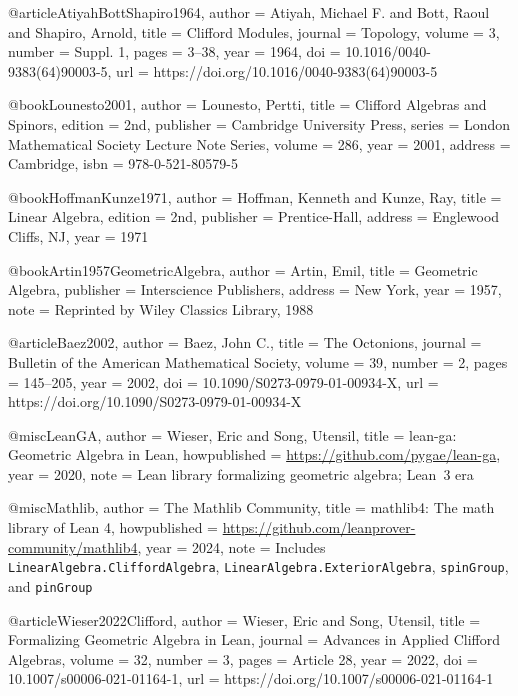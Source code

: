 \documentclass{birkjour}
\theoremstyle{plain}
\theoremstyle{definition}
\theoremstyle{remark}
\begin{document}
@article{AtiyahBottShapiro1964,
  author  = {Atiyah, Michael F. and Bott, Raoul and Shapiro, Arnold},
  title   = {Clifford Modules},
  journal = {Topology},
  volume  = {3},
  number  = {Suppl. 1},
  pages   = {3--38},
  year    = {1964},
  doi     = {10.1016/0040-9383(64)90003-5},
  url     = {https://doi.org/10.1016/0040-9383(64)90003-5}
}

@book{Lounesto2001,
  author    = {Lounesto, Pertti},
  title     = {Clifford Algebras and Spinors},
  edition   = {2nd},
  publisher = {Cambridge University Press},
  series    = {London Mathematical Society Lecture Note Series},
  volume    = {286},
  year      = {2001},
  address   = {Cambridge},
  isbn      = {978-0-521-80579-5}
}

@book{HoffmanKunze1971,
  author    = {Hoffman, Kenneth and Kunze, Ray},
  title     = {Linear Algebra},
  edition   = {2nd},
  publisher = {Prentice-Hall},
  address   = {Englewood Cliffs, NJ},
  year      = {1971}
}

@book{Artin1957GeometricAlgebra,
  author    = {Artin, Emil},
  title     = {Geometric Algebra},
  publisher = {Interscience Publishers},
  address   = {New York},
  year      = {1957},
  note      = {Reprinted by Wiley Classics Library, 1988}
}

@article{Baez2002,
  author  = {Baez, John C.},
  title   = {The Octonions},
  journal = {Bulletin of the American Mathematical Society},
  volume  = {39},
  number  = {2},
  pages   = {145--205},
  year    = {2002},
  doi     = {10.1090/S0273-0979-01-00934-X},
  url     = {https://doi.org/10.1090/S0273-0979-01-00934-X}
}

@misc{LeanGA,
  author       = {Wieser, Eric and Song, Utensil},
  title        = {{lean-ga}: Geometric Algebra in {Lean}},
  howpublished = {\url{https://github.com/pygae/lean-ga}},
  year         = {2020},
  note         = {Lean library formalizing geometric algebra; Lean~3 era}
}

@misc{Mathlib,
  author       = {{The Mathlib Community}},
  title        = {{mathlib4}: The math library of {Lean} 4},
  howpublished = {\url{https://github.com/leanprover-community/mathlib4}},
  year         = {2024},
  note         = {Includes {\tt LinearAlgebra.CliffordAlgebra},
                  {\tt LinearAlgebra.ExteriorAlgebra},
                  {\tt spinGroup}, and {\tt pinGroup}}
}

@article{Wieser2022Clifford,
  author  = {Wieser, Eric and Song, Utensil},
  title   = {Formalizing Geometric Algebra in {Lean}},
  journal = {Advances in Applied Clifford Algebras},
  volume  = {32},
  number  = {3},
  pages   = {Article 28},
  year    = {2022},
  doi     = {10.1007/s00006-021-01164-1},
  url     = {https://doi.org/10.1007/s00006-021-01164-1}
}
\end{document}
